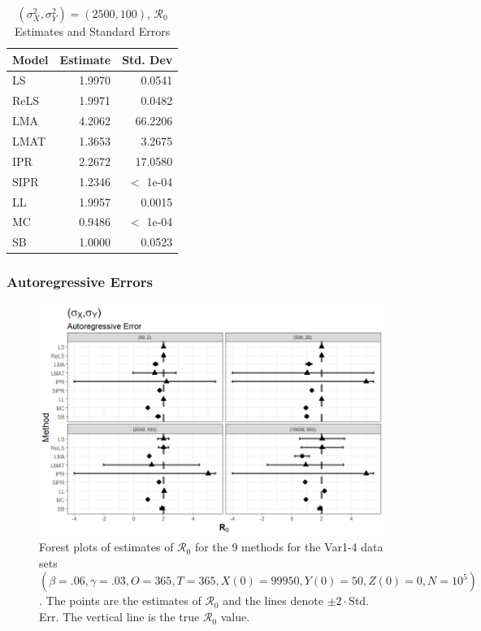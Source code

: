 \documentclass[12pt]{article}
\newcommand{\xxsir}{\ensuremath{9} } %
\newcommand{\rr}{\ensuremath{\mathcal{R}_0}}
\begin{document}
\begin{table}[H]
	
	
	\centering
	\begin{tabular}[t]{l|r|r}
		\hline
		Model & Estimate & Std. Dev\\
		\hline
		LS & 1.9970 & 0.0541\\
		\hline
		ReLS & 1.9971 & 0.0482\\
		\hline
		LMA & 4.2062 & 66.2206\\
		\hline
		LMAT & 1.3653 & 3.2675\\
		\hline
		IPR & 2.2672 & 17.0580\\
		\hline
		SIPR & 1.2346 & $<$ 1e-04\\
		\hline
		LL & 1.9957 & 0.0015\\
		\hline
		MC & 0.9486 & $<$ 1e-04\\
		\hline
		SB & 1.0000 & 0.0523\\
		\hline
	\end{tabular}
	\caption{$(\sigma^2_X, \sigma^2_Y) = (2500, 100)$, $\rr$ Estimates and Standard Errors}
\end{table}

\subsubsection{Autoregressive Errors}

\begin{figure}[H]
	\begin{center}
		\includegraphics[scale=0.5]{images/var_ar.jpeg}
		\caption{Forest plots of estimates of $\rr$ for the \xxsir methods for the Var1-4 data sets $(\beta=.06, \gamma=.03, O=365, T=365, X(0)=99950, Y(0)=50, Z(0)=0, N=10^5)$.  The points are the estimates of $\rr$ and the lines denote $\pm 2\cdot $Std. Err.  The vertical line is the true $\rr$ value.}
	\end{center}
\end{figure}
\end{document}
